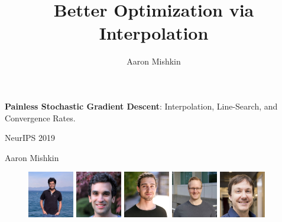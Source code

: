 \documentclass[notheorems]{beamer}
\title{Better Optimization via Interpolation}
\author{Aaron Mishkin}
\institute{}
\date{}
\begin{document}
        \begin{frame}
        \vspace{1em}
        \begin{center}
            {\Large \textbf{Painless Stochastic Gradient Descent}: Interpolation, Line-Search, and Convergence Rates. \vspace{1em}}


            {\large NeurIPS 2019 \vspace{0.5em} }

            {\large Aaron Mishkin }
        \end{center}

        \vspace{2.5em}

        \begin{figure}
            \centering
            \includegraphics[width=0.18\textwidth]{collaborators/sharan}
            \includegraphics[width=0.18\textwidth]{collaborators/issam}
            \includegraphics[width=0.18\textwidth]{collaborators/gauthier}
            \includegraphics[width=0.18\textwidth]{collaborators/mark}
            \includegraphics[width=0.18\textwidth]{collaborators/simon}
        \end{figure}


\end{frame}
\end{document}
